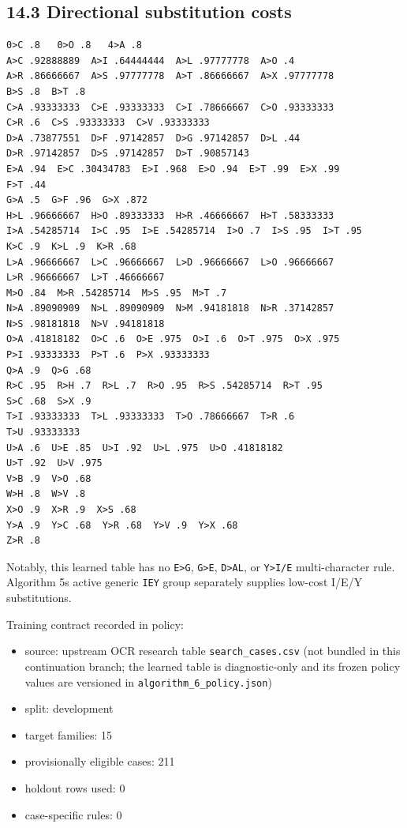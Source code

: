 \subsection{14.3 Directional substitution costs}\label{143-directional-substitution-costs}

\begin{verbatim}
0>C .8   0>O .8   4>A .8
A>C .92888889  A>I .64444444  A>L .97777778  A>O .4
A>R .86666667  A>S .97777778  A>T .86666667  A>X .97777778
B>S .8  B>T .8
C>A .93333333  C>E .93333333  C>I .78666667  C>O .93333333
C>R .6  C>S .93333333  C>V .93333333
D>A .73877551  D>F .97142857  D>G .97142857  D>L .44
D>R .97142857  D>S .97142857  D>T .90857143
E>A .94  E>C .30434783  E>I .968  E>O .94  E>T .99  E>X .99
F>T .44
G>A .5  G>F .96  G>X .872
H>L .96666667  H>O .89333333  H>R .46666667  H>T .58333333
I>A .54285714  I>C .95  I>E .54285714  I>O .7  I>S .95  I>T .95
K>C .9  K>L .9  K>R .68
L>A .96666667  L>C .96666667  L>D .96666667  L>O .96666667
L>R .96666667  L>T .46666667
M>O .84  M>R .54285714  M>S .95  M>T .7
N>A .89090909  N>L .89090909  N>M .94181818  N>R .37142857
N>S .98181818  N>V .94181818
O>A .41818182  O>C .6  O>E .975  O>I .6  O>T .975  O>X .975
P>I .93333333  P>T .6  P>X .93333333
Q>A .9  Q>G .68
R>C .95  R>H .7  R>L .7  R>O .95  R>S .54285714  R>T .95
S>C .68  S>X .9
T>I .93333333  T>L .93333333  T>O .78666667  T>R .6
T>U .93333333
U>A .6  U>E .85  U>I .92  U>L .975  U>O .41818182
U>T .92  U>V .975
V>B .9  V>O .68
W>H .8  W>V .8
X>O .9  X>R .9  X>S .68
Y>A .9  Y>C .68  Y>R .68  Y>V .9  Y>X .68
Z>R .8
\end{verbatim}

Notably, this learned table has no \texttt{E\textgreater{}G}, \texttt{G\textgreater{}E}, \texttt{D\textgreater{}AL}, or \texttt{Y\textgreater{}I/E} multi-character rule. Algorithm 5\textquotesingle s active generic \texttt{IEY} group separately supplies low-cost I/E/Y substitutions.

Training contract recorded in policy:

\begin{itemize}
\tightlist
\item
  source: upstream OCR research table \texttt{search\_\allowbreak{}cases.csv} (not bundled in this
  continuation branch; the learned table is diagnostic-only and its frozen
  policy values are versioned in \texttt{algorithm\_\allowbreak{}6\_\allowbreak{}policy.json})
\item
  split: development
\item
  target families: 15
\item
  provisionally eligible cases: 211
\item
  holdout rows used: 0
\item
  case-specific rules: 0
\end{itemize}

